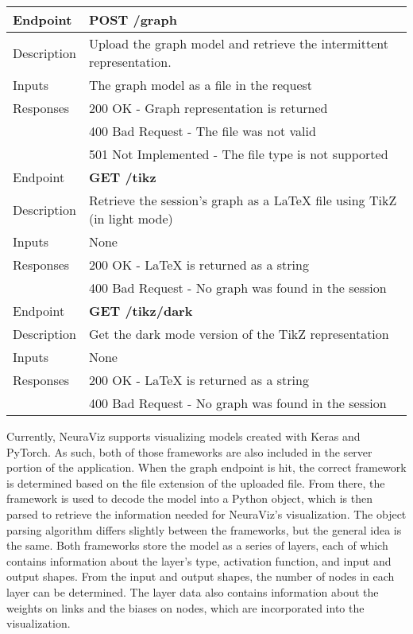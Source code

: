 \begin{center}
    \begin{tabular}{|l|l|}
        \hline
        \rowcolor{gray!40} Endpoint & \textbf{POST /graph} \\
        \hline
        Description & Upload the graph model and retrieve the intermittent representation. \\
        \hline
        Inputs & The graph model as a file in the request \\
        \hline
        Responses & 200 OK - Graph representation is returned \\
        & 400 Bad Request - The file was not valid \\
        & 501 Not Implemented - The file type is not supported \\
        \hline
        \rowcolor{gray!40} Endpoint & \textbf{GET /tikz}\\
        \hline
        Description & Retrieve the session's graph as a \LaTeX{} file using TikZ (in light mode) \\
        \hline
        Inputs & None \\
        \hline
        Responses & 200 OK - \LaTeX{} is returned as a string \\
        & 400 Bad Request - No graph was found in the session \\
        \hline
        \rowcolor{gray!40} Endpoint & \textbf{GET /tikz/dark} \\
        \hline 
        Description & Get the dark mode version of the TikZ representation \\
        \hline
        Inputs & None \\
        \hline
        Responses & 200 OK - \LaTeX{} is returned as a string \\
        & 400 Bad Request - No graph was found in the session \\
        \hline
    \end{tabular}
    \label{tab:api_endpoints}
\end{center}

Currently, NeuraViz supports visualizing models created with Keras and PyTorch. As such, both of those frameworks are also included in the server portion of the application. When the graph endpoint is hit, the correct framework is determined based on the file extension of the uploaded file. From there, the framework is used to decode the model into a Python object, which is then parsed to retrieve the information needed for NeuraViz's visualization. The object parsing algorithm differs slightly between the frameworks, but the general idea is the same. Both frameworks store the model as a series of layers, each of which contains information about the layer's type, activation function, and input and output shapes. From the input and output shapes, the number of nodes in each layer can be determined. The layer data also contains information about the weights on links and the biases on nodes, which are incorporated into the visualization.

